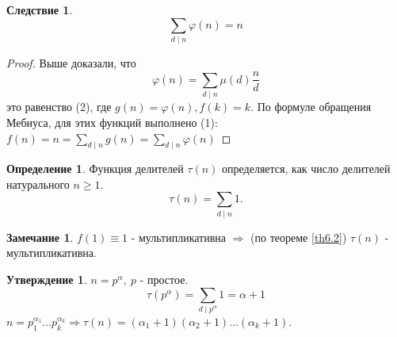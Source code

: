 \documentclass[a4paper, 12pt]{article}
\renewcommand{\phi}{\varphi}
\renewcommand{\div}{\mid}
\theoremstyle{definition}
\newtheorem{definition}{Определение}[section]
\newtheorem*{consequense}{Следствие}
\newtheorem{statement}{Утверждение}[section]
\newtheorem*{comm}{Замечание}
\begin{document}
    \begin{consequense}
        \[\sum\limits_{d\div n}\phi(n)=n\]
    \end{consequense}
    \begin{proof}
        Выше доказали, что
        \[\phi(n)=\sum\limits_{d\div n}\mu(d)\frac{n}{d}\]
        это равенство (2), где $g(n)=\phi(n), f(k)=k$. По формуле обращения Мебиуса, для этих функций выполнено (1): $f(n)=n=\sum\limits_{d\div n}g(n)=\sum\limits_{d\div n}\phi(n)$ 
    \end{proof} 
    \begin{definition}
        Функция делителей $\tau(n)$ определяется, как число делителей натурального $n\geq 1$.
        \[\tau(n)=\sum\limits_{d\div n}1.\]
    \end{definition}
    \begin{comm}
        $f(1)\equiv 1$ - мультипликативна $\Rightarrow$ (по теореме \ref{th6.2}) $\tau(n)$ - мультипликативна.
    \end{comm} 
    \begin{statement}
        $n=p^{\alpha}, \ p$ - простое.
        \[\tau(p^{\alpha})=\sum\limits_{d\div p^{\alpha}}1=\alpha+1\]
        $n=p_1^{\alpha_1}\dots p_k^{\alpha_k}\Rightarrow \tau(n)=(\alpha_1+1)(\alpha_2+1)\dots(\alpha_k+1)$.
    \end{statement} 
\end{document}
